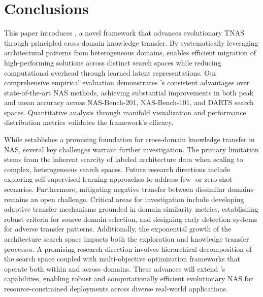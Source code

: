 \documentclass[../main.tex]{subfiles}
\begin{document}
\section{Conclusions}\label{sec:conclusion}

\DiffBegin
This paper introduces \OUR{}, a novel framework that advances evolutionary TNAS through principled cross-domain knowledge transfer. By systematically leveraging architectural patterns from heterogeneous domains, \OUR{} enables efficient migration of high-performing solutions across distinct search spaces while reducing computational overhead through learned latent representations. Our comprehensive empirical evaluation demonstrates \OUR{}'s consistent advantages over state-of-the-art NAS methods, achieving substantial improvements in both peak and mean accuracy across NAS-Bench-201, NAS-Bench-101, and DARTS search spaces. Quantitative analysis through manifold visualization and performance distribution metrics validates the framework's efficacy.

While \OUR{} establishes a promising foundation for cross-domain knowledge transfer in NAS, several key challenges warrant further investigation. The primary limitation stems from the inherent scarcity of labeled architecture data when scaling to complex, heterogeneous search spaces. Future research directions include exploring self-supervised learning approaches to address few- or zero-shot scenarios. Furthermore, mitigating negative transfer between dissimilar domains remains an open challenge. Critical areas for investigation include developing adaptive transfer mechanisms grounded in domain similarity metrics, establishing robust criteria for source domain selection, and designing early detection systems for adverse transfer patterns.
Additionally, the exponential growth of the architecture search space impacts both the exploration and knowledge transfer processes. A promising research direction involves hierarchical decomposition of the search space coupled with multi-objective optimization frameworks that operate both within and across domains. These advances will extend \OUR{}'s capabilities, enabling robust and computationally efficient evolutionary NAS for resource-constrained deployments across diverse real-world applications.
\DiffEnd
\end{document}
